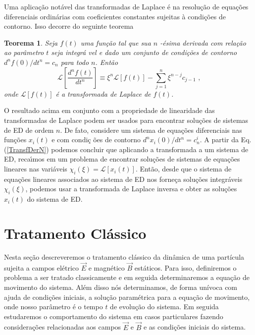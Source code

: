 \documentclass[twocolumn]{rbef}
\newcommand{\1}{\mathbbm{1}}
\newtheorem{theorem}{Teorema}
\begin{document}
Uma aplicação notável das transformadas de Laplace é na resolução de
equações diferenciais ordinárias com coeficientes constantes sujeitas à
condições de contorno. Isso decorre do seguinte teorema \cite{Arfken}
\begin{theorem} \label{Teo1} Seja $f\left( t\right) $ uma fun\c{c}\~{a}o
  tal que sua $n$%
  -\'{e}sima derivada com rela\c{c}\~{a}o ao par\^{a}metro $t$ seja
  integr\'{a}%
  vel e dado um conjunto de condi\c{c}\~{o}es de contorno
  $d^{n}f\left( 0\right) /dt^{n}=c_{n}$ para todo $n$. Ent\~{a}o%
  \begin{equation}
    \mathcal{L}\left[ \frac{d^{n}f\left( t\right) }{dt^{n}}\right] \equiv \xi^{n}%
    \mathcal{L}\left[ f\left( t\right) \right] -\sum_{j=1}^{n}\xi^{n-j}c_{j-1} \text{ ,}  \label{TransfDerN}
  \end{equation}%
  onde $\mathcal{L}\left[ f\left( t\right) \right] $ \'{e} a
  transformada de Laplace de $f\left( t\right)$.
\end{theorem}

O resultado acima em conjunto com a propriedade de linearidade das
transformadas de Laplace podem ser usados para encontrar
solu\c{c}\~{o}es de sistemas de ED de ordem $n$. De fato, considere um
sistema de equa\c{c}\~{o}es diferenciais nas fun\c{c}\~{o}es
$x_{i}\left( t\right) $ e com condi\c{c}%
\~{o}es de contorno $d^{n}x_{i}\left( 0\right) /dt^{n}=c_{n}^{i}$. A
partir da Eq. (\ref{TransfDerN}) podemos concluir que aplicando a
transformada a um sistema de ED, reca\'{\i}mos em um problema de
encontrar solu\c{c}\~{o}es de sistemas de equa\c{c}\~{o}es lineares nas
vari\'{a}veis $%
\chi _{i}\left( \xi\right) =\mathcal{L}\left[ x_{i}\left( t\right)
\right] $.  Ent\~{a}o, desde que o sistema de equa\c{c}\~{o}es lineares
associados ao sistema de ED nos forne\c{c}a solu\c{c}\~{o}es
integr\'{a}veis $\chi _{i}\left( \xi\right) $, podemos usar a
transformada de Laplace inversa e obter as solu\c{c}\~{o}es
$x_{i}\left( t\right) $ do sistema de ED.

\section{Tratamento Clássico} \label{Classico} Nesta seção descreveremos
o tratamento clássico da dinâmica de uma partícula sujeita a campos
elétrico $\vec{E}$ e magnético $\vec{B}$ estáticos. Para isso,
definiremos o problema a ser tratado classicamente e em seguida
determinaremos a equação de movimento do sistema. Além disso nós
determinamos, de forma unívoca com ajuda de condições iniciais, a
solução paramétrica para a equação de movimento, onde nosso parâmetro é
o tempo $t$ de evolução do sistema. Em seguida estudaremos o
comportamento do sistema em casos particulares fazendo considerações
relacionadas aos campos $\vec{E}$ e $\vec{B}$ e as condições iniciais do
sistema.
\end{document}
